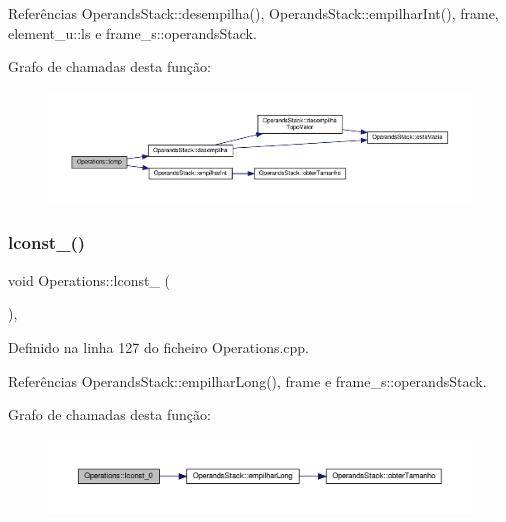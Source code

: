 Referências Operands\+Stack\+::desempilha(), Operands\+Stack\+::empilhar\+Int(), frame, element\+\_\+u\+::ls e frame\+\_\+s\+::operands\+Stack.

Grafo de chamadas desta função\+:\nopagebreak
\begin{figure}[H]
\begin{center}
\leavevmode
\includegraphics[width=350pt]{classOperations_a7ad4ad0e417096686b55dde9142b830a_cgraph}
\end{center}
\end{figure}
\mbox{\label{classOperations_a89586a819a6e67c2168d7d6e43f087ef}} 
\subsubsection{\texorpdfstring{lconst\+\_()}{lconst\_0()}}
{\footnotesize\ttfamily void Operations\+::lconst\+\_ (\begin{DoxyParamCaption}{ }\end{DoxyParamCaption})\hspace{0.3cm}{\ttfamily [static]}, {\ttfamily [private]}}



Definido na linha 127 do ficheiro Operations.\+cpp.



Referências Operands\+Stack\+::empilhar\+Long(), frame e frame\+\_\+s\+::operands\+Stack.

Grafo de chamadas desta função\+:\nopagebreak
\begin{figure}[H]
\begin{center}
\leavevmode
\includegraphics[width=350pt]{classOperations_a89586a819a6e67c2168d7d6e43f087ef_cgraph}
\end{center}
\end{figure}
\mbox{\label{classOperations_ae6c6a8e3d75dec712e534434f85909ce}} 
